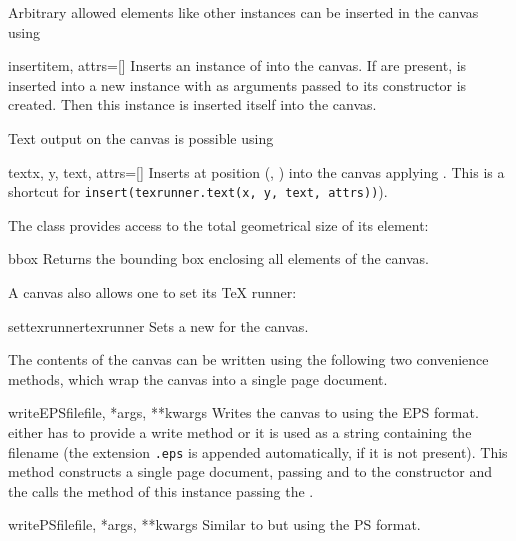 Arbitrary allowed elements like other  instances can
be inserted in the canvas using

\begin{methoddesc}{insert}{item, attrs=[]}
  Inserts an instance of  into the canvas.  If
   are present,  is inserted into a new
  instance with  as arguments passed to its
  constructor is created. Then this  instance is
  inserted itself into the canvas.
\end{methoddesc}

Text output on the canvas is possible using

\begin{methoddesc}{text}{x, y, text, attrs=[]}
  Inserts  at position (, ) into the
  canvas applying . This is a shortcut for
  \texttt{insert(texrunner.text(x, y, text, attrs))}).
\end{methoddesc}

The  class provides access to the total geometrical size
of its element:

\begin{methoddesc}{bbox}{}
  Returns the bounding box enclosing all elements of the canvas.
\end{methoddesc}

A canvas also allows one to set its TeX runner:

\begin{methoddesc}{settexrunner}{texrunner}
  Sets a new  for the canvas.
\end{methoddesc}

The contents of the canvas can be written using the following two
convenience methods, which wrap the canvas into a single page
document.

\begin{methoddesc}{writeEPSfile}{file, *args, **kwargs}
  Writes the canvas to  using the EPS format. 
  either has to provide a write method or it is used as a string
  containing the filename (the extension \texttt{.eps} is appended
  automatically, if it is not present). This method constructs a
  single page document, passing  and  to the
   constructor and the calls the
   method of this 
  instance passing the .
\end{methoddesc}

\begin{methoddesc}{writePSfile}{file, *args, **kwargs}
  Similar to  but using the PS format.
\end{methoddesc}

